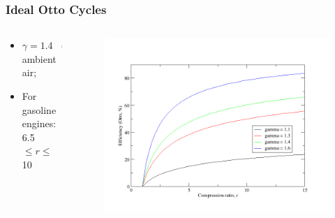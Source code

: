\documentclass[10pt,compress]{beamer}
\begin{document}
\begin{frame}
 \frametitle{Ideal Otto Cycles}
  \begin{columns}
   \begin{column}[c]{0.3\linewidth}
    \begin{itemize}
     \item <1-> $\gamma=1.4\;\;\Longrightarrow$ ambient air;
     \item <2-> For gasoline engines: \\
 6.5$\leq r \leq$ 10
    \end{itemize}
   \end{column}
   \begin{column}[c]{0.7\linewidth}
    \begin{figure}%
     \begin{center}
      \includegraphics[width=9.cm,clip]{./Pics/Otto_Effic_CompRatio.png}
     \end{center}
    \end{figure}   
   \end{column}  
  \end{columns}
\end{frame}
\end{document}
